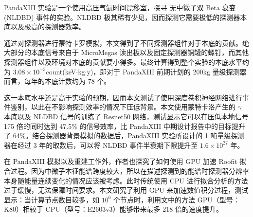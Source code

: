 
\pkuthssffaq %

PandaXIII 实验是一个使用高压气氙时间漂移室，探寻 \xeots 无中微子双 Beta 衰变 (NLDBD) 事件的实验。NLDBD 极其稀有少见，因而探测它需要极低的探测器本底以及极高的探测器效率。

通过对探测器进行蒙特卡罗模拟，本文得到了不同探测器组件对于本底的贡献。绝大部分的本底信号来自于 MicroMegas 读出板以及固定探测器铜罐的螺钉，而其他探测器组件以及环境对本底的贡献要小得多。最终计算得到整个实验的本底水平约为 $3.08\times 10^{-3}$count\/(keV$\cdot$kg$\cdot$y)，即对于 PandaXIII 前期计划的 200kg 量级探测器而言，每年的本底计数约为 78 个。

这一本底水平还是高于实验的预期，因而本文测试了使用深度卷积神经网络进行事件鉴别，以此在不影响探测效率的情况下压低背景。本文使用蒙特卡洛产生的 $\gamma$ 本底以及 NLDBD 信号的训练了 Resnet50 网络，测试显示它可以在压低本地信号 175 倍的同时达到 47.5\% 的信号效率，比 PandaXIII 中期设计报告中的目标提升了 64\%。结合探测器背景模拟的数据后，PandaXIII 实验所设计的 1 吨量级探测器在经过 3 年的取数后，可以将 \xeots NLDBD 事件半衰期下限提升至 $1.6\times10^{27}$ 年。

在 PandaXIII 模拟以及重建工作外，作者也探究了如何使用 GPU 加速 Roofit 拟合过程。因为中微子本征能谱跨度较大，所以在描述探测到的能谱时探测器分辨率本身随能量连续变化的情况应该被考虑。此时传统使用 CPU 进行拟合分析的方法过于缓慢，无法保障时间要求。本文研究了利用 GPU 来加速数值积分过程，测试显示：当计算节点数目较多，如 $10^{6}$ 个节点时，利用文中的方法 GPU（型号：K80）相较于 CPU（型号：E2603v3）能够带来最多 218 倍的速度提升。


